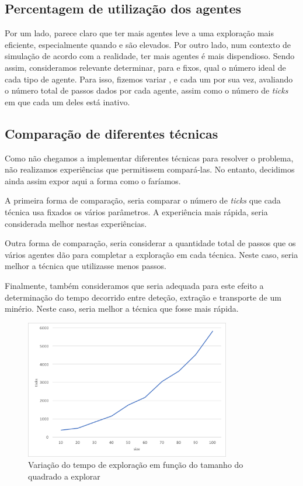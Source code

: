 \documentclass[12pt]{report}
\begin{document}
\subsection{Percentagem de utilização dos agentes}

Por um lado, parece claro que ter mais agentes leve a uma exploração mais eficiente, especialmente quando \size e \minerals são elevados. Por outro lado, num contexto de simulação de acordo com a realidade, ter mais agentes é mais dispendioso. Sendo assim, consideramos relevante determinar, para \size e \minerals fixos, qual o número ideal de cada tipo de agente. Para isso, fizemos variar \spotters, \producers e \transporters cada um por sua vez, avaliando o número total de passos dados por cada agente, assim como o número de \emph{ticks} em que cada um deles está inativo.

\subsection{Comparação de diferentes técnicas}

Como não chegamos a implementar diferentes técnicas para resolver o problema, não realizamos experiências que permitissem compará-las. No entanto, decidimos ainda assim expor aqui a forma como o faríamos.

A primeira forma de comparação, seria comparar o número de \emph{ticks} que cada técnica usa fixados os vários parâmetros. A experiência mais rápida, seria considerada melhor nestas experiências.

Outra forma de comparação, seria considerar a quantidade total de passos que os vários agentes dão para completar a exploração em cada técnica. Neste caso, seria melhor a técnica que utilizasse menos passos.

Finalmente, também consideramos que seria adequada para este efeito a determinação do tempo decorrido entre deteção, extração e transporte de um minério. Neste caso, seria melhor a técnica que fosse mais rápida.

\begin{figure}[h]
	\centering
    \includegraphics[width=0.8\textwidth]{ticks-size}
	\caption{Variação do tempo de exploração em função do tamanho do quadrado a explorar}
	\label{ticks-size}
\end{figure}
\end{document}
